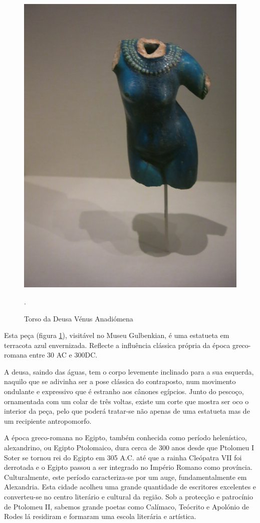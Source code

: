 \documentclass{article}
\begin{document}
\begin{figure}
\centering\includegraphics[height=0.3\textheight,keepaspectratio]
                          {venus.jpg}
  \caption{Torso da Deusa Vénus Anadiómena}.
  \label{fig:2}
\end{figure}

Esta peça (figura \ref{fig:2}), visitável no Museu Gulbenkian, é uma
estatueta em terracota azul envernizada. Reflecte a influência
clássica própria da época greco-romana entre 30 AC e 300DC.

A deusa, saindo das águas, tem o corpo levemente inclinado para a sua
esquerda, naquilo que se adivinha ser a pose clássica do contraposto,
num movimento ondulante e expressivo que é estranho aos cânones
egípcios. Junto do pescoço, ornamentada com um colar de três voltas,
existe um corte que mostra ser oco o interior da peça, pelo que poderá
tratar-se não apenas de uma estatueta mas de um recipiente
antropomorfo.

A época greco-romana no Egipto, também conhecida como período
helenístico, alexandrino, ou Egipto Ptolomaico, dura cerca de 300 anos
desde que Ptolomeu I Soter se tornou rei do Egipto em 305 A.C. até que
a rainha Cleópatra VII foi derrotada e o Egipto passou a ser integrado
no Império Romano como província. Culturalmente, este período
caracteriza-se por um auge, fundamentalmente em Alexandria. Esta
cidade acolheu uma grande quantidade de escritores excelentes e
converteu-se no centro literário e cultural da região. Sob a protecção
e patrocínio de Ptolomeu II, sabemos grande poetas como Calímaco,
Teócrito e Apolónio de Rodes lá residiram e formaram uma escola
literária e artística.
\end{document}
